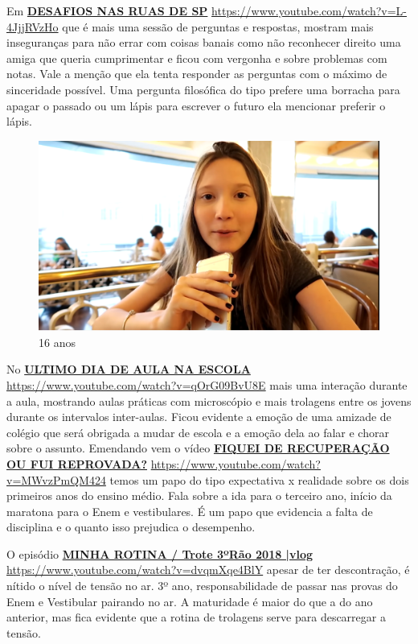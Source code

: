 Em \href{https://www.youtube.com/watch?v=L-4JjjRVzHo}{\textbf{DESAFIOS NAS RUAS DE SP}} \url{https://www.youtube.com/watch?v=L-4JjjRVzHo} que é mais uma sessão de perguntas e respostas, mostram mais inseguranças para não errar com coisas banais como não reconhecer direito uma amiga que queria cumprimentar e ficou com vergonha e sobre problemas com notas. Vale a menção que ela tenta responder as perguntas com o máximo de sinceridade possível. Uma pergunta filosófica do tipo prefere uma borracha para apagar o passado ou um lápis para escrever o futuro ela mencionar preferir o lápis.

\begin{figure}[h!]
    \centering
    \includegraphics[width=0.7\linewidth]{fig/Zabetta-16-anos1}
    \caption{16 anos}
    \label{fig:zabetta-16-anos1}
\end{figure}

No \href{https://www.youtube.com/watch?v=qOrG09BvU8E}{\textbf{ULTIMO DIA DE AULA NA ESCOLA}} \url{https://www.youtube.com/watch?v=qOrG09BvU8E} mais uma interação durante a aula, mostrando aulas práticas com microscópio e mais trolagens entre os jovens durante os intervalos inter-aulas. Ficou evidente a emoção de uma amizade de colégio que será obrigada a mudar de escola e a emoção dela ao falar e chorar sobre o assunto.
Emendando vem o vídeo \href{https://www.youtube.com/watch?v=MWvzPmQM424}{\textbf{FIQUEI DE RECUPERAÇÃO OU FUI REPROVADA?}} \url{https://www.youtube.com/watch?v=MWvzPmQM424} temos um papo do tipo expectativa x realidade sobre os dois primeiros anos do ensino médio. Fala sobre a ida para o terceiro ano, início da maratona para o Enem e vestibulares. É um papo que evidencia a falta de disciplina e o quanto isso prejudica o desempenho.

O episódio \href{https://www.youtube.com/watch?v=dvqmXqe4BlY}{\textbf{\textbf{MINHA ROTINA / Trote 3ºRão 2018 |vlog}}} \url{https://www.youtube.com/watch?v=dvqmXqe4BlY} apesar de ter descontração, é nítido o nível de tensão no ar. 3º ano, responsabilidade de passar nas provas do Enem e Vestibular pairando no ar. A maturidade é maior do que a do ano anterior, mas fica evidente que a rotina de trolagens serve para descarregar a tensão.


